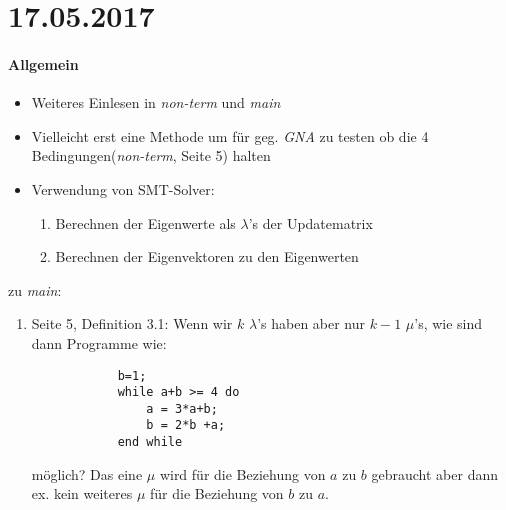 \section*{17.05.2017}

\paragraph{Allgemein}
\begin{itemize}
	\item Weiteres Einlesen in \emph{non-term} und \emph{main}
	\item Vielleicht erst eine Methode um für geg. \emph{GNA} zu testen ob die 4 Bedingungen(\emph{non-term}, Seite 5) halten
	\item Verwendung von SMT-Solver:
		\begin{enumerate}
			\item Berechnen der Eigenwerte als $\lambda$'s der Updatematrix
			\item Berechnen der Eigenvektoren zu den Eigenwerten
		\end{enumerate}
\end{itemize}

zu \emph{main}:
\begin{enumerate}
	\item Seite 5, Definition 3.1: Wenn wir $k$ $\lambda$'s haben aber nur $k-1$ $\mu$'s, wie sind dann Programme wie: 
		\begin{lstlisting}
			b=1;
			while a+b >= 4 do
				a = 3*a+b;
				b = 2*b +a;
			end while 
		\end{lstlisting}
		möglich? Das eine $\mu$ wird für die Beziehung von $a$ zu $b$ gebraucht aber dann ex. kein weiteres $\mu$ für die Beziehung von $b$ zu $a$.
	
\end{enumerate}